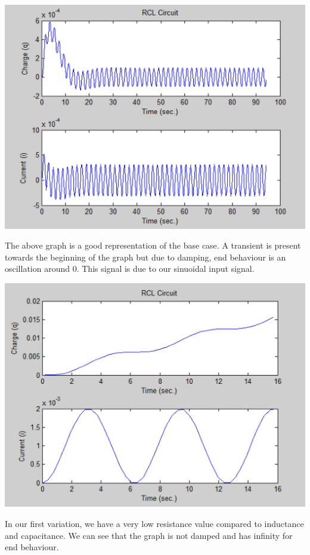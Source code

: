 \documentclass[titlepage,12pt]{article}
\begin{document}
\begin{center}
        \includegraphics[scale=0.6]{base.png}
\end{center}

\noindent The above graph is a good representation of the base case. A transient is present towards the beginning of the graph but due to damping, end behaviour is an oscillation around 0. This signal is due to our sinuoidal input signal.

\begin{center}
        \includegraphics[scale=0.6]{rcl-lowr.png}
\end{center}

\noindent In our first variation, we have a very low resistance value compared to inductance and capacitance. We can see that the graph is not damped and has infinity for end behaviour.
\end{document}
